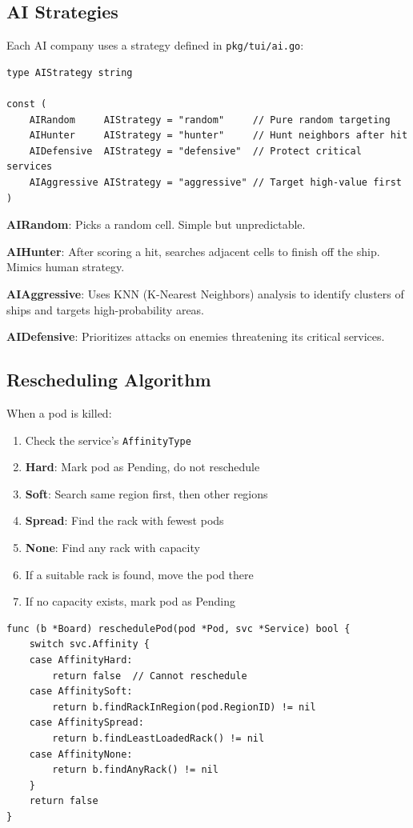 \documentclass[11pt]{article}
\begin{document}
\subsection{AI Strategies}

Each AI company uses a strategy defined in \texttt{pkg/tui/ai.go}:

\begin{lstlisting}
type AIStrategy string

const (
    AIRandom     AIStrategy = "random"     // Pure random targeting
    AIHunter     AIStrategy = "hunter"     // Hunt neighbors after hit
    AIDefensive  AIStrategy = "defensive"  // Protect critical services
    AIAggressive AIStrategy = "aggressive" // Target high-value first
)
\end{lstlisting}

\textbf{AIRandom}: Picks a random cell. Simple but unpredictable.

\textbf{AIHunter}: After scoring a hit, searches adjacent cells to finish off the ship. Mimics human strategy.

\textbf{AIAggressive}: Uses KNN (K-Nearest Neighbors) analysis to identify clusters of ships and targets high-probability areas.

\textbf{AIDefensive}: Prioritizes attacks on enemies threatening its critical services.

\subsection{Rescheduling Algorithm}

When a pod is killed:

\begin{enumerate}
    \item Check the service's \texttt{AffinityType}
    \item \textbf{Hard}: Mark pod as Pending, do not reschedule
    \item \textbf{Soft}: Search same region first, then other regions
    \item \textbf{Spread}: Find the rack with fewest pods
    \item \textbf{None}: Find any rack with capacity
    \item If a suitable rack is found, move the pod there
    \item If no capacity exists, mark pod as Pending
\end{enumerate}

\begin{lstlisting}
func (b *Board) reschedulePod(pod *Pod, svc *Service) bool {
    switch svc.Affinity {
    case AffinityHard:
        return false  // Cannot reschedule
    case AffinitySoft:
        return b.findRackInRegion(pod.RegionID) != nil
    case AffinitySpread:
        return b.findLeastLoadedRack() != nil
    case AffinityNone:
        return b.findAnyRack() != nil
    }
    return false
}
\end{lstlisting}
\end{document}
